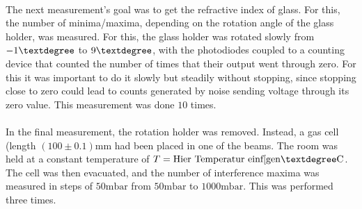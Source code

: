 \\
The next measurement's goal was to get the refractive index of glass. For this, the number of minima/maxima, depending on the rotation angle of the glass holder, was measured. For this, the glass holder was rotated slowly from $-1\textdegree$ to $9\textdegree$, with the photodiodes coupled to a counting device that counted the number of times that their output went through zero. For this it was important to do it slowly but steadily without stopping, since stopping close to zero could lead to counts generated by noise sending voltage through its zero value. This measurement was done $10$ times.\\
\\
In the final measurement, the rotation holder was removed. Instead, a gas cell (length $(100\pm 0.1)\text{mm}$ had been placed in one of the beams. The room was held at a constant temperature of $T = \text{Hier Temperatur einf[gen} \textdegree\text{C}$.\\
The cell was then evacuated, and the number of interference maxima was measured in steps of $50 \text{mbar}$ from $50\text{mbar}$ to $1000\text{mbar}$. This was performed three times.
